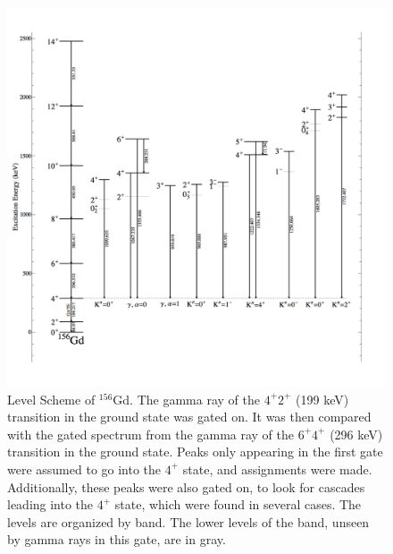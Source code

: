 \begin{figure}
    \centering
    \includegraphics[scale=0.25]{156GdTablesAndFigs/156Gd_4to2.png}
    \caption{Level Scheme of $^{156}$Gd. The gamma ray of the $4^+$\rightarrow$2^+$ (199 keV) transition in the ground state was gated on. It was then compared with the gated spectrum from the gamma ray of the $6^+$\rightarrow$4^+$ (296 keV) transition in the ground state. Peaks only appearing in the first gate were assumed to go into the $4^+$ state, and assignments were made. Additionally, these peaks were also gated on, to look for cascades leading into the $4^+$ state, which were found in several cases. The levels are organized by band. The lower levels of the band, unseen by gamma rays in this gate, are in gray.}
    \label{fig:156_4to2}
\end{figure}